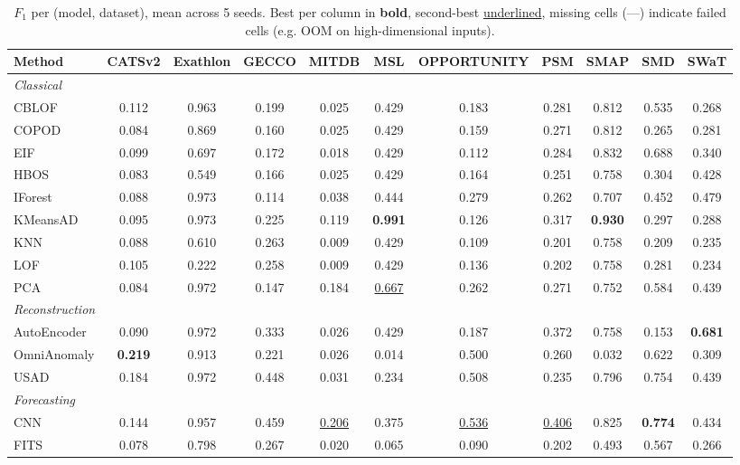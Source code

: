 \begin{table}[t]
\centering
\small
\caption{$F_1$ per (model, dataset), mean across 5 seeds. Best per column in \textbf{bold}, second-best \underline{underlined}, missing cells (---) indicate failed cells (e.g. OOM on high-dimensional inputs).}
\label{tab:by-dataset-standard-f1}
\begin{tabular}{lcccccccccc}
\toprule
Method & CATSv2 & Exathlon & GECCO & MITDB & MSL & OPPORTUNITY & PSM & SMAP & SMD & SWaT \\
\midrule
\multicolumn{11}{l}{\textit{Classical}} \\
CBLOF & 0.112 & 0.963 & 0.199 & 0.025 & 0.429 & 0.183 & 0.281 & 0.812 & 0.535 & 0.268 \\
COPOD & 0.084 & 0.869 & 0.160 & 0.025 & 0.429 & 0.159 & 0.271 & 0.812 & 0.265 & 0.281 \\
EIF & 0.099 & 0.697 & 0.172 & 0.018 & 0.429 & 0.112 & 0.284 & 0.832 & 0.688 & 0.340 \\
HBOS & 0.083 & 0.549 & 0.166 & 0.025 & 0.429 & 0.164 & 0.251 & 0.758 & 0.304 & 0.428 \\
IForest & 0.088 & 0.973 & 0.114 & 0.038 & 0.444 & 0.279 & 0.262 & 0.707 & 0.452 & 0.479 \\
KMeansAD & 0.095 & 0.973 & 0.225 & 0.119 & \textbf{0.991} & 0.126 & 0.317 & \textbf{0.930} & 0.297 & 0.288 \\
KNN & 0.088 & 0.610 & 0.263 & 0.009 & 0.429 & 0.109 & 0.201 & 0.758 & 0.209 & 0.235 \\
LOF & 0.105 & 0.222 & 0.258 & 0.009 & 0.429 & 0.136 & 0.202 & 0.758 & 0.281 & 0.234 \\
PCA & 0.084 & 0.972 & 0.147 & 0.184 & \underline{0.667} & 0.262 & 0.271 & 0.752 & 0.584 & 0.439 \\
\midrule
\multicolumn{11}{l}{\textit{Reconstruction}} \\
AutoEncoder & 0.090 & 0.972 & 0.333 & 0.026 & 0.429 & 0.187 & 0.372 & 0.758 & 0.153 & \textbf{0.681} \\
OmniAnomaly & \textbf{0.219} & 0.913 & 0.221 & 0.026 & 0.014 & 0.500 & 0.260 & 0.032 & 0.622 & 0.309 \\
USAD & 0.184 & 0.972 & 0.448 & 0.031 & 0.234 & 0.508 & 0.235 & 0.796 & 0.754 & 0.439 \\
\midrule
\multicolumn{11}{l}{\textit{Forecasting}} \\
CNN & 0.144 & 0.957 & 0.459 & \underline{0.206} & 0.375 & \underline{0.536} & \underline{0.406} & 0.825 & \textbf{0.774} & 0.434 \\
FITS & 0.078 & 0.798 & 0.267 & 0.020 & 0.065 & 0.090 & 0.202 & 0.493 & 0.567 & 0.266 \\

\end{tabular}
\end{table}

